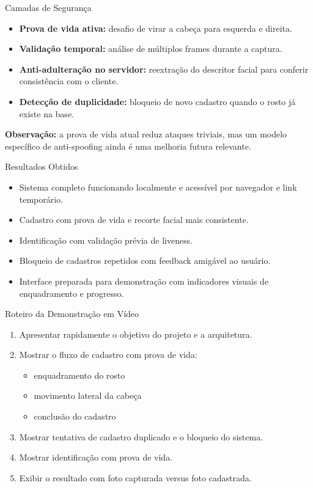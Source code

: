 \documentclass[aspectratio=169,11pt]{beamer}
\begin{document}
\begin{frame}{Camadas de Seguran\c{c}a}
  \begin{itemize}
    \item \textbf{Prova de vida ativa:} desafio de virar a cabe\c{c}a para esquerda e direita.
    \item \textbf{Valida\c{c}\~ao temporal:} an\'alise de m\'ultiplos frames durante a captura.
    \item \textbf{Anti-adultera\c{c}\~ao no servidor:} reextra\c{c}\~ao do descritor facial para conferir consist\^encia com o cliente.
    \item \textbf{Detec\c{c}\~ao de duplicidade:} bloqueio de novo cadastro quando o rosto j\'a existe na base.
  \end{itemize}

  \vspace{0.3cm}
  \textbf{Observa\c{c}\~ao:} a prova de vida atual reduz ataques triviais, mas um modelo espec\'ifico de anti-spoofing ainda \'e uma melhoria futura relevante.
\end{frame}

\begin{frame}{Resultados Obtidos}
  \begin{itemize}
    \item Sistema completo funcionando localmente e acess\'ivel por navegador e link tempor\'ario.
    \item Cadastro com prova de vida e recorte facial mais consistente.
    \item Identifica\c{c}\~ao com valida\c{c}\~ao pr\'evia de liveness.
    \item Bloqueio de cadastros repetidos com feedback amig\'avel ao usu\'ario.
    \item Interface preparada para demonstra\c{c}\~ao com indicadores visuais de enquadramento e progresso.
  \end{itemize}
\end{frame}

\begin{frame}{Roteiro da Demonstra\c{c}\~ao em V\'ideo}
  \begin{enumerate}
    \item Apresentar rapidamente o objetivo do projeto e a arquitetura.
    \item Mostrar o fluxo de cadastro com prova de vida:
    \begin{itemize}
      \item enquadramento do rosto
      \item movimento lateral da cabe\c{c}a
      \item conclus\~ao do cadastro
    \end{itemize}
    \item Mostrar tentativa de cadastro duplicado e o bloqueio do sistema.
    \item Mostrar identifica\c{c}\~ao com prova de vida.
    \item Exibir o resultado com foto capturada versus foto cadastrada.
  \end{enumerate}
\end{frame}
\end{document}
